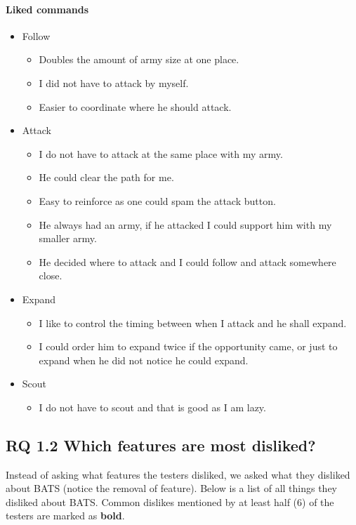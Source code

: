 \paragraph{Liked commands}
\begin{itemize}
	\item Follow
	\begin{itemize}
		\item Doubles the amount of army size at one place.
		\item I did not have to attack by myself.
		\item Easier to coordinate where he should attack.
	\end{itemize}
	\item Attack
	\begin{itemize}
		\item I do not have to attack at the same place with my army.
		\item He could clear the path for me.
		\item Easy to reinforce as one could spam the attack button.
		\item He always had an army, if he attacked I could support him with my smaller army.
		\item He decided where to attack and I could follow and attack somewhere close.
	\end{itemize}
	\item Expand
	\begin{itemize}
		\item I like to control the timing between when I attack and he shall expand.
		\item I could order him to expand twice if the opportunity came, or just to expand when he did not notice he could expand.
	\end{itemize}
	\item Scout
	\begin{itemize}
		\item I do not have to scout and that is good as I am lazy.
	\end{itemize}
\end{itemize}

\subsection{RQ 1.2 Which features are most disliked?}
Instead of asking what features the testers disliked, we asked what they disliked about BATS (notice the removal of feature). Below is a list of all things they disliked about BATS. Common dislikes mentioned by at least half (6) of the testers are marked as \textbf{bold}.
